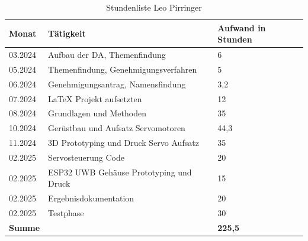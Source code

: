 \begin{table}[h]
	\begin{tabular}{p{2.5cm} p{10.5cm} p{3cm}}
		\hline
		\textbf{Monat} & \textbf{Tätigkeit} & \textbf{Aufwand in Stunden} \\
		\hline
		03.2024 & Aufbau der DA, Themenfindung & 6 \\
		05.2024 & Themenfindung, Genehmigungsverfahren & 5 \\
		06.2024 & Genehmigungsantrag, Namensfindung & 3,2 \\
		07.2024 & LaTeX Projekt aufsetzten& 12 \\
		08.2024 & Grundlagen und Methoden & 35 \\
		10.2024 & Gerüstbau und Aufsatz Servomotoren & 44,3 \\
		11.2024 & 3D Prototyping und Druck Servo Aufsatz & 35 \\
		02.2025 & Servosteuerung Code & 20 \\
		02.2025 & ESP32 UWB Gehäuse Prototyping und Druck& 15\\
		02.2025 & Ergebnisdokumentation &  20\\
		02.2025 & Testphase & 30 \\
		
		\hline
		\textbf{Summe} & & \textbf{225,5} \\
		\hline
	\end{tabular}
	\caption{Stundenliste Leo Pirringer}
	\label{tab:arbeitsaufwand_Pirringer}
\end{table}